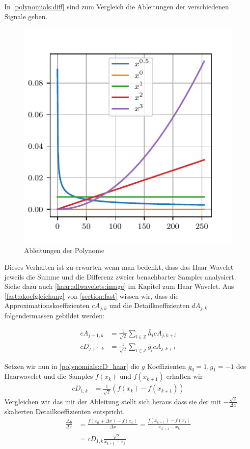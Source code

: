 \begin{refsection}
In \autoref{polynomials:diff} sind zum Vergleich die Ableitungen der
verschiedenen Signale geben.

\begin{figure}
    \centering
    \includegraphics{papers/polynomials/images/polynomials_signals_diff.pdf}
    \caption{Ableitungen der Polynome\label{polynomials:diff}}
\end{figure}

Dieses Verhalten ist zu erwarten wenn man bedenkt, dass das Haar Wavelet
jeweils die Summe und die Differenz zweier benachbarter Samples analysiert.
Siehe dazu auch \autoref{haar:allwavelets:image} im Kapitel zum Haar Wavelet.
Aus \autoref{fast:akoefgleichung} von \autoref{section:fast} wissen wir, dass
die Approximationskoeffizienten $cA_{j,k}$ und die Detailkoeffizienten
$dA_{j,k}$ folgendermassen gebildet werden:

\begin{align}
cA_{j+1,k}
&=
\frac{1}{\sqrt{2}} \sum_{l\in\mathbb Z} \bar{h}_l cA_{j,k+l}
\\
cD_{j+1,k}
&=
\frac{1}{\sqrt{2}} \sum_{l\in\mathbb Z} \bar{g}_l cA_{j,k+l}
\label{polynomials:cD_haar}
\end{align}

Setzen wir nun in \autoref{polynomials:cD_haar} die $g$ Koeffizienten $g_0 = 1,
g_1 = -1$ des Haarwavelet und die Samples $f(x_k)$ und $f(x_{k + 1})$ erhalten
wir
\begin{align}
    cD_{1,k} & = \frac{1}{\sqrt{2}}\left(f(x_k) - f(x_{k + 1})\right)
\end{align}
Vergleichen wir das mit der Ableitung stellt sich heraus dass sie der mit
$-\frac{\sqrt{2}}{\Delta x}$ skalierten Detailkoeffizienten entspricht.
\begin{align}
\frac{\Delta y}{\Delta x} &= \frac{f(x_0+\Delta x) - f(x_0)}{\Delta x}
                           = \frac{f(x_{k+1}) - f(x_k)}{x_{k+1} - x_k} \\
                          &= cD_{1,k} \frac{-\sqrt{2}}{x_{k+1} - x_k}
\end{align}


\end{refsection}
